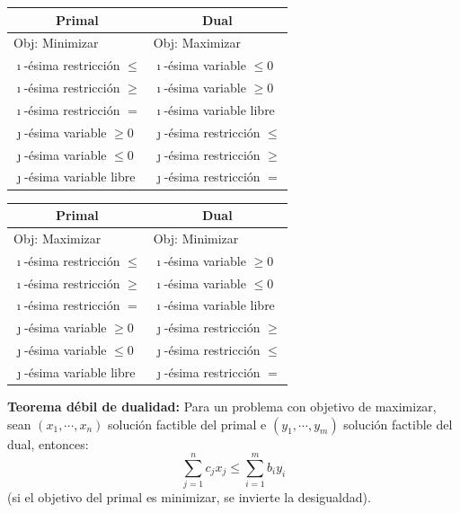 \documentclass[a4paper,oneside,12pt]{amsart}
\theoremstyle{definition}
\begin{document}


\newpage

   \begin{tabular}{|l|l|} \hline
        \multicolumn{1}{|c|}{Primal} & \multicolumn{1}{c|}{Dual}  \\ \hline
        Obj: Minimizar & Obj: Maximizar \\ \hline
        $\imath$-ésima restricción $\leq$ & $\imath$-ésima variable $\leq 0$ \\
        $\imath$-ésima restricción $\geq$ & $\imath$-ésima variable $\geq 0$ \\
        $\imath$-ésima restricción $=$ & $\imath$-ésima variable libre \\
        $\jmath$-ésima variable $\geq 0$ & $\jmath$-ésima restricción $\leq$ \\
        $\jmath$-ésima variable $\leq 0$ & $\jmath$-ésima restricción $\geq$ \\
        $\jmath$-ésima variable libre & $\jmath$-ésima restricción $=$ \\ \hline
    \end{tabular}
    \begin{tabular}{|l|l|} \hline
        \multicolumn{1}{|c|}{Primal} & \multicolumn{1}{c|}{Dual}  \\ \hline
        Obj: Maximizar & Obj: Minimizar \\ \hline
        $\imath$-ésima restricción $\leq$ & $\imath$-ésima variable $\geq 0$ \\
        $\imath$-ésima restricción $\geq$ & $\imath$-ésima variable $\leq 0$ \\
        $\imath$-ésima restricción $=$ & $\imath$-ésima variable libre \\
        $\jmath$-ésima variable $\geq 0$ & $\jmath$-ésima restricción $\geq$ \\
        $\jmath$-ésima variable $\leq 0$ & $\jmath$-ésima restricción $\leq$ \\
        $\jmath$-ésima variable libre & $\jmath$-ésima restricción $=$ \\ \hline
    \end{tabular}
    \vspace{1cm}

    \textbf{Teorema débil de dualidad:} Para un problema con objetivo de maximizar, sean $(x_1,\cdots,x_n)$ solución
factible del primal e $(y_1,\cdots, y_m)$ solución factible del dual, entonces:
    \[ \displaystyle \sum_{j=1}^n c_jx_j \leq \sum_{i=1}^m b_iy_i\]
    (si el objetivo del primal es minimizar, se invierte la desigualdad).
\end{document}
